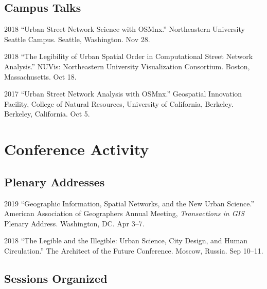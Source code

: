 \documentclass[12pt,letterpaper]{report}
\begin{document}
	\subsection*{Campus Talks}
	
	\begin{tablist}
		
		\item[2018] \tab \enquote{Urban Street Network Science with OSMnx.} Northeastern University Seattle Campus. Seattle, Washington. Nov 28.
		
		\item[2018] \tab \enquote{The Legibility of Urban Spatial Order in Computational Street Network Analysis.} NUVis: Northeastern University Visualization Consortium. Boston, Massachusetts. Oct 18.
		
		\item[2017] \tab \enquote{Urban Street Network Analysis with OSMnx.} Geospatial Innovation Facility, College of Natural Resources, University of California, Berkeley. Berkeley, California. Oct 5.
		
	\end{tablist}
	
	
	\section*{Conference Activity}
	
	\subsection*{Plenary Addresses}
	
	\begin{tablist}
		
		\item[2019] \tab \enquote{Geographic Information, Spatial Networks, and the New Urban Science.} American Association of Geographers Annual Meeting, \emph{Transactions in GIS} Plenary Address. Washington, DC. Apr 3--7.
		
		\item[2018] \tab \enquote{The Legible and the Illegible: Urban Science, City Design, and Human Circulation.} The Architect of the Future Conference. Moscow, Russia. Sep 10--11.
		
	\end{tablist}
	
	\subsection*{Sessions Organized}
	
\end{document}
